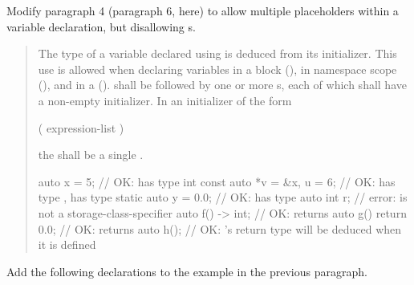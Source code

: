 Modify paragraph 4 (paragraph 6, here) to allow multiple placeholders within a 
variable declaration, but disallowing s.

\begin{quote}
\pnum
The type of a variable declared using 
is deduced from its initializer.
% 
This use is allowed when declaring variables in a block (),
in namespace scope (), and in a 
 ().
%
%
   shall be followed by one or more s,
each of which shall have a non-empty initializer.
%
In an initializer of the form
\begin{codeblock}
( expression-list )
\end{codeblock}
the  shall be a single 
.
% 
\enterexample
\begin{codeblock}
auto x = 5;                // OK:  has type int
const auto *v = &x, u = 6; // OK:  has type ,  has type 
static auto y = 0.0;       // OK:  has type 
auto int r;                // error:  is not a storage-class-specifier
auto f() -> int;           // OK:  returns 
auto g() { return 0.0; }   // OK:  returns 
auto h();                  // OK: 's return type will be deduced when it is defined
\end{codeblock}
\exitexample
\end{quote}

Add the following declarations to the example in the previous paragraph.

